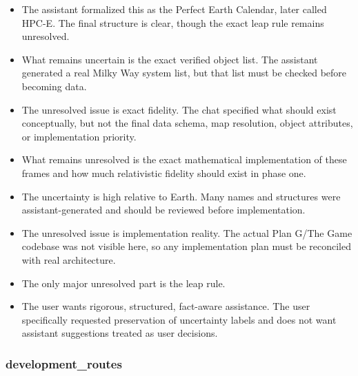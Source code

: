 \documentclass[11pt,a4paper]{report}
\begin{document}
\begin{itemize}
\item The assistant formalized this as the Perfect Earth Calendar, later called HPC-E. The final structure is clear, though the exact leap rule remains unresolved.
\item What remains uncertain is the exact verified object list. The assistant generated a real Milky Way system list, but that list must be checked before becoming data.
\item The unresolved issue is exact fidelity. The chat specified what should exist conceptually, but not the final data schema, map resolution, object attributes, or implementation priority.
\item What remains unresolved is the exact mathematical implementation of these frames and how much relativistic fidelity should exist in phase one.
\item The uncertainty is high relative to Earth. Many names and structures were assistant-generated and should be reviewed before implementation.
\item The unresolved issue is implementation reality. The actual Plan G/The Game codebase was not visible here, so any implementation plan must be reconciled with real architecture.
\item The only major unresolved part is the leap rule.
\item The user wants rigorous, structured, fact-aware assistance. The user specifically requested preservation of uncertainty labels and does not want assistant suggestions treated as user decisions.
\end{itemize}

\subsubsection{development\_routes}
\end{document}

